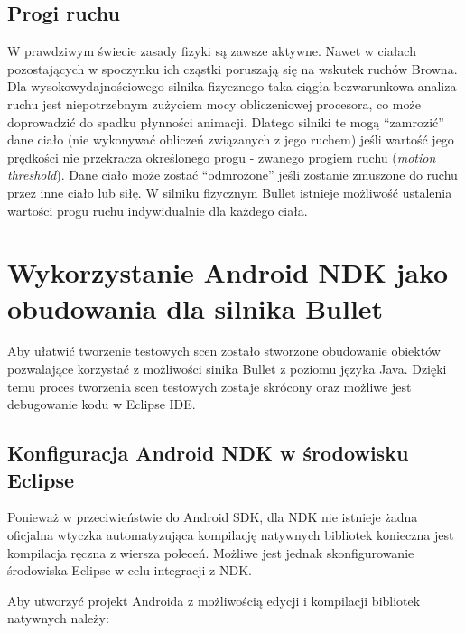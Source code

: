 \subsection{Progi ruchu}
W prawdziwym świecie zasady fizyki są zawsze aktywne. Nawet w ciałach
pozostających w spoczynku ich cząstki poruszają się na wskutek ruchów Browna.
Dla wysokowydajnościowego silnika fizycznego taka ciągła bezwarunkowa analiza
ruchu jest niepotrzebnym zużyciem mocy obliczeniowej procesora, co może
doprowadzić do spadku płynności animacji. Dlatego silniki te mogą ``zamrozić''
dane ciało (nie wykonywać obliczeń związanych z jego ruchem) jeśli wartość jego
prędkości nie przekracza określonego progu - zwanego progiem
ruchu (\emph{motion threshold}). Dane ciało może zostać ``odmrożone'' jeśli
zostanie zmuszone do ruchu przez inne ciało lub siłę. W silniku fizycznym Bullet
istnieje możliwość ustalenia wartości progu ruchu indywidualnie dla każdego
ciała.


\newpage
\section{Wykorzystanie Android NDK jako obudowania dla silnika
Bullet} \label{sec:NDKuse}
Aby ułatwić tworzenie testowych scen zostało stworzone obudowanie obiektów
pozwalające korzystać z możliwości sinika Bullet z poziomu języka Java. Dzięki
temu proces tworzenia scen testowych zostaje skrócony oraz możliwe jest
debugowanie kodu w Eclipse IDE.

\subsection{Konfiguracja Android NDK w środowisku Eclipse}\label{sec:autoNDK}
Ponieważ w przeciwieństwie do Android SDK, dla NDK nie istnieje żadna
oficjalna wtyczka automatyzująca kompilację natywnych bibliotek konieczna jest
kompilacja ręczna z wiersza poleceń. Możliwe jest jednak skonfigurowanie
środowiska Eclipse w celu integracji z NDK.
  
Aby utworzyć projekt Androida z
możliwością edycji i kompilacji bibliotek natywnych należy: \\


